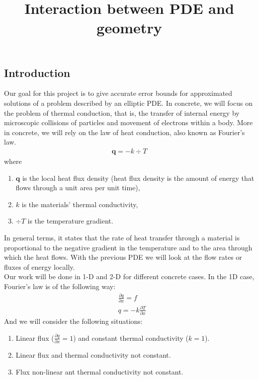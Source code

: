 \documentclass{article}
\title{Interaction between PDE and geometry}
\date{}
\begin{document}
    \maketitle
    \subsection*{Introduction}
    Our goal for this project is to give accurate error bounds for approximated solutions of a problem described by an elliptic PDE. In concrete, we will focus on the problem of thermal conduction, that is, the transfer of internal energy by microscopic collisions of particles and movement of electrons within a body. More in concrete, we will rely on the law of heat conduction, also known as Fourier's law.
    \begin{align*}
        \bm{q} = -k \div T
    \end{align*}
    where 
    \begin{enumerate}
        \item[] $\bm{q}$ is the local heat flux density (heat flux density is the amount of energy that flows through a unit area per unit time),
        \item[] $k$ is the materials' thermal conductivity,
        \item[] $\div{T}$ is the temperature gradient.
    \end{enumerate}
    In general terms, it states that the rate of heat transfer through a material is proportional to the negative gradient in the temperature and to the area through which the heat flows. With the previous PDE we will look at the flow rates or fluxes of energy locally. \\
    Our work will be done in 1-D and 2-D for different concrete cases. In the 1D case, Fourier's law is of the following way:
    \begin{align*}
        &\frac{\partial q}{\partial x} = f \\
        &q = -k \frac{\partial T}{\partial x} 
    \end{align*}
    And we will consider the following situations:
    \begin{enumerate}
        \item Linear flux ($\frac{\partial q}{\partial x} = 1$) and constant thermal conductivity ($k=1$).
        \item Linear flux and thermal conductivity not constant.
        \item Flux non-linear ant thermal conductivity not constant.
    \end{enumerate}
\end{document}
